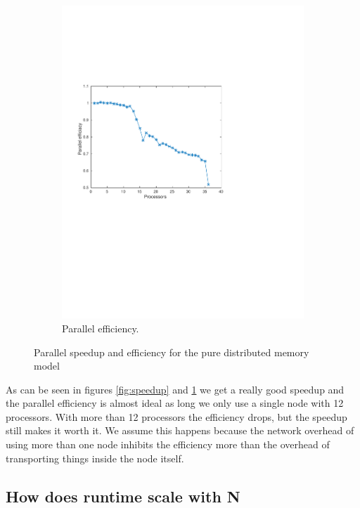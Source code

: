 \begin{figure}
\begin{subfigure}[b]{0.45\textwidth}
			\includegraphics[width=\textwidth]{./figures/efficiacy}
			\caption{Parallel efficiency.}
			\label{fig:efficiacy}
        \end{subfigure}%
        \caption{Parallel speedup and efficiency for the pure distributed memory model}
        \label{fig:analysis}
\end{figure}

As can be seen in figures \ref{fig:speedup} and \ref{fig:efficiacy} we get a really good speedup and the parallel efficiency is almost ideal as long we only use a single node with 12 processors. With more than 12 processors the efficiency drops, but the speedup still makes it worth it. We assume this happens because the network overhead of using more than one node inhibits the efficiency more than the overhead of transporting things inside the node itself.


\subsection*{How does runtime scale with N}